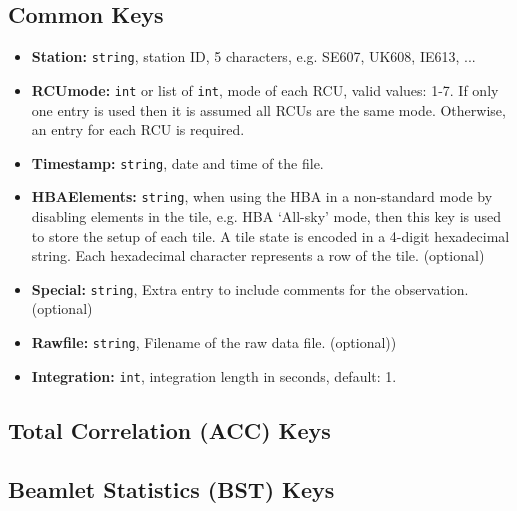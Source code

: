 \documentclass[10pt,a4paper]{article}
\begin{document}
\subsection{Common Keys}
\label{sec:common_keys}

\begin{itemize}
    \item \textbf{Station:} \texttt{string}, station ID, 5 characters, e.g.
    SE607, UK608, IE613, ...
    \item \textbf{RCUmode:} \texttt{int} or list of \texttt{int}, mode of each
    RCU, valid values: 1-7. If only one entry is used then it is assumed all
    RCUs are the same mode. Otherwise, an entry for each RCU is required.
    \item \textbf{Timestamp:} \texttt{string}, date and time of the file.
    \item \textbf{HBAElements:} \texttt{string}, when using the HBA in a
    non-standard mode by disabling elements in the tile, e.g. HBA `All-sky'
    mode, then this key is used to store the setup of each tile. A tile state is
    encoded in a 4-digit hexadecimal string. Each hexadecimal character
    represents a row of the tile. (optional)
    \item \textbf{Special:} \texttt{string}, Extra entry to include comments for
    the observation. (optional)
    \item \textbf{Rawfile:} \texttt{string}, Filename of the raw data file.
    (optional))
    \item \textbf{Integration:} \texttt{int}, integration length in seconds,
    default: 1.
\end{itemize}

\subsection{Total Correlation (ACC) Keys}

\subsection{Beamlet Statistics (BST) Keys}
\label{sec:bst_keys}
\end{document}
